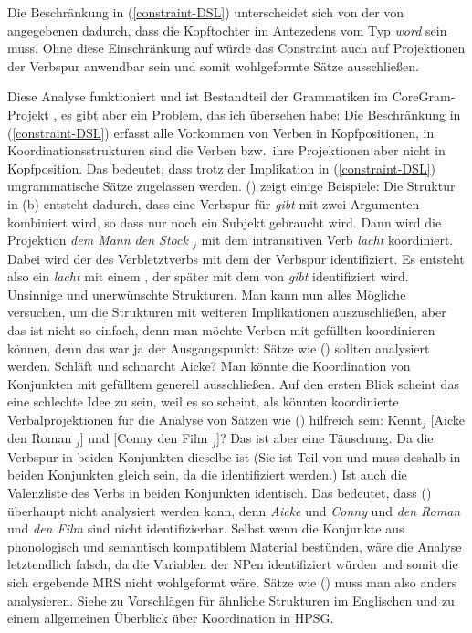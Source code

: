 Die Beschränkung in (\ref{constraint-DSL}) unterscheidet sich von der von
\citet[]{Meurers2000b} angegebenen \ua dadurch, dass die Kopftochter im Antezedens vom Typ
\emph{word} sein muss. Ohne diese Einschränkung auf  würde das Constraint auch auf
Projektionen der Verbspur anwendbar sein und somit wohlgeformte Sätze ausschließen.

Diese Analyse funktioniert und ist Bestandteil der Grammatiken im CoreGram-Projekt
\citep{MuellerCoreGram}, es gibt aber ein Problem, das ich übersehen habe: Die Beschränkung in
(\ref{constraint-DSL}) erfasst alle Vorkommen von Verben in Kopfpositionen, in
Koordinationsstrukturen sind die Verben bzw.\ ihre Projektionen aber nicht in Kopfposition. Das
bedeutet, dass trotz der Implikation in (\ref{constraint-DSL}) ungrammatische Sätze zugelassen
werden. () zeigt einige Beispiele:
\eal
\label{ex-Probleme bei zyklischen Verbspuren mit Koordination}
\zl
Die Struktur in (b) entsteht dadurch, dass eine Verbspur für \emph{gibt} mit zwei Argumenten kombiniert
wird, so dass nur noch ein Subjekt gebraucht wird. Dann wird die Projektion \emph{dem Mann den Stock
  \trace$_j$} mit dem intransitiven Verb \emph{lacht} koordiniert. Dabei wird der \dslw des
Verbletztverbs mit dem der Verbspur identifiziert. Es entsteht also ein \emph{lacht} mit einem
\dslw, der später mit dem \localw von \emph{gibt} identifiziert wird. Unsinnige und unerwünschte
Strukturen. Man kann nun alles Mögliche versuchen, um die Strukturen mit weiteren Implikationen
auszuschließen, aber das ist nicht so einfach, denn man möchte Verben mit gefüllten \dslwen
koordinieren können, denn das war ja der Ausgangspunkt: Sätze wie () sollten analysiert werden.
\ea
Schläft und schnarcht Aicke?
\z
Man könnte die Koordination von Konjunkten mit gefülltem \dslw generell ausschließen. Auf den ersten
Blick scheint das eine schlechte Idee zu sein, weil es so scheint, als könnten koordinierte
Verbalprojektionen für die Analyse von Sätzen wie () hilfreich sein:
\ea
Kennt$_j$ [Aicke den Roman \trace$_j$] und [Conny den Film \trace$_j$]?
\z
Das ist aber eine Täuschung. Da die Verbspur in beiden Konjunkten dieselbe ist (Sie ist Teil von
\head und muss deshalb in beiden Konjunkten gleich sein, da die \catwe identifiziert werden.) Ist
auch die Valenzliste des Verbs in beiden Konjunkten identisch. Das bedeutet, dass ()
überhaupt nicht analysiert werden kann, denn \emph{Aicke} und \emph{Conny} und \emph{den Roman} und
\emph{den Film} sind nicht identifizierbar. Selbst wenn die Konjunkte aus phonologisch und
semantisch kompatiblem Material bestünden, wäre die Analyse letztendlich falsch, da die Variablen
der NPen identifiziert würden und somit die sich ergebende MRS nicht wohlgeformt wäre. Sätze wie
() muss man also anders analysieren. Siehe  zu Vorschlägen für
ähnliche Strukturen im Englischen und  zu einem allgemeinen Überblick über
Koordination in HPSG.

